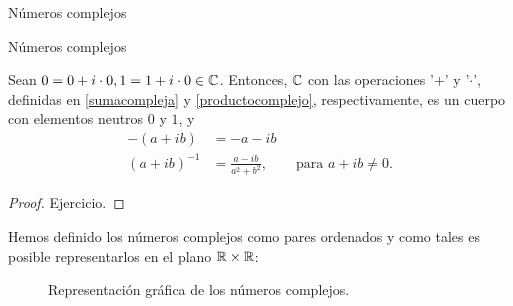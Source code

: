\begin{chapter}{N\'umeros complejos}
\begin{section}{N\'umeros complejos}
        \begin{proposicion}
            Sean $0 = 0 + i\cdot 0, 1 = 1 + i\cdot 0\in \mathbb C$. Entonces, $\mathbb C$ con las operaciones '$+$' y '$\cdot$', definidas en \eqref{sumacompleja} y 
            \eqref{productocomplejo},  respectivamente, es un cuerpo con elementos neutros $0$ y $1$, y
            \begin{align*}
            -(a+ib) &= -a -ib \\
            (a+ib)^{-1} &= 	\frac{a-ib}{ a^2 + b^2}, \qquad \text{para $a+ib \ne 0$}.
            \end{align*}
        \end{proposicion}
        \begin{proof}
            Ejercicio.
        \end{proof}

        Hemos definido los números complejos como pares ordenados y como tales es posible representarlos en el plano $\mathbb R \times \mathbb R$:
        
        
        
        \begin{figure}[h]
        	\centering
            
            
            \caption{Representación gráfica de los números complejos. }
        \end{figure}
        

\end{section}
\end{chapter}

